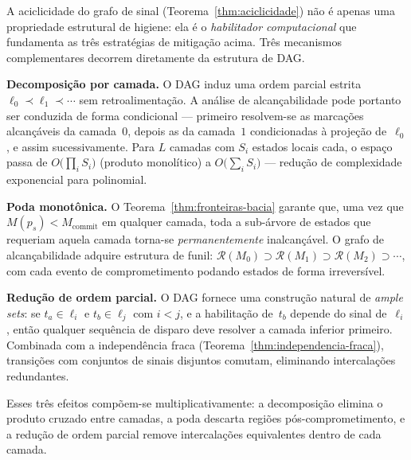 \begin{remark}
\label{rem:aciclicidade-reducao}
A aciclicidade do grafo de sinal (Teorema~\ref{thm:aciclicidade}) não é apenas
uma propriedade estrutural de higiene: ela é o \emph{habilitador computacional}
que fundamenta as três estratégias de mitigação acima.  Três mecanismos
complementares decorrem diretamente da estrutura de DAG.

\textbf{Decomposição por camada.}  O DAG induz uma ordem parcial estrita
$\ell_0 \prec \ell_1 \prec \cdots$ sem retroalimentação.  A análise de
alcançabilidade pode portanto ser conduzida de forma condicional --- primeiro
resolvem-se as marcações alcançáveis da camada~$0$, depois as da camada~$1$
condicionadas à projeção de~$\ell_0$, e assim sucessivamente.  Para $L$
camadas com $S_i$ estados locais cada, o espaço passa de
$O\!\bigl(\prod_i S_i\bigr)$ (produto monolítico) a
$O\!\bigl(\sum_i S_i\bigr)$ --- redução de complexidade exponencial para
polinomial.

\textbf{Poda monotônica.}  O Teorema~\ref{thm:fronteiras-bacia}
garante que, uma vez que
$M(p_s) < M_{\text{commit}}$ em qualquer camada, toda a sub-árvore de estados
que requeriam aquela camada torna-se \emph{permanentemente} inalcançável.  O
grafo de alcançabilidade adquire estrutura de funil:
$\mathcal{R}(M_0) \supset \mathcal{R}(M_1) \supset \mathcal{R}(M_2)
\supset \cdots$, com cada evento de comprometimento podando estados de forma
irreversível.

\textbf{Redução de ordem parcial.}  O DAG fornece uma construção natural de
\emph{ample sets}: se $t_a \in \ell_i$ e $t_b \in \ell_j$ com $i < j$, e a
habilitação de~$t_b$ depende do sinal de~$\ell_i$, então qualquer sequência de
disparo deve resolver a camada inferior primeiro.  Combinada com a independência
fraca (Teorema~\ref{thm:independencia-fraca}), transições com conjuntos de
sinais disjuntos comutam, eliminando intercalações redundantes.

Esses três efeitos compõem-se multiplicativamente: a decomposição elimina o
produto cruzado entre camadas, a poda descarta regiões pós-comprometimento, e a
redução de ordem parcial remove intercalações equivalentes dentro de cada
camada.
\end{remark}

